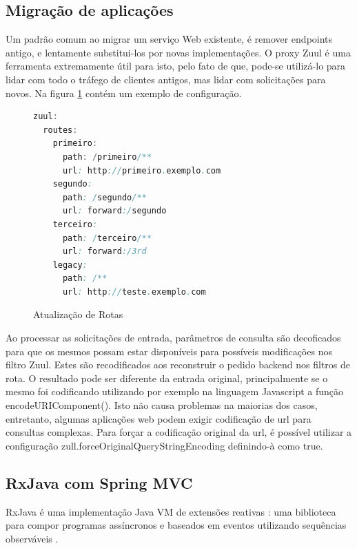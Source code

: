 \documentclass[journal]{IEEEtran}
\begin{document}
\subsection{Migração de aplicações}

Um padrão comum ao migrar um serviço Web existente, é remover endpoints antigo, e lentamente substitui-los por novas implementações. O proxy Zuul é uma ferramenta extremamente útil para isto, pelo fato de que, pode-se utilizá-lo para lidar com todo o tráfego de clientes antigos, mas lidar com solicitações para novos. Na figura \ref{alg:vinteum} contém um exemplo de configuração.

\begin{figure}[h]
\centering

\begin{lstlisting}[language=Java]
 zuul:
  routes:
    primeiro:
      path: /primeiro/**
      url: http://primeiro.exemplo.com
    segundo:
      path: /segundo/**
      url: forward:/segundo
    terceiro:
      path: /terceiro/**
      url: forward:/3rd
    legacy:
      path: /**
      url: http://teste.exemplo.com
\end{lstlisting}

\caption{Atualização de Rotas}
\label{alg:vinteum}
\end{figure}

Ao processar as solicitações de entrada, parâmetros de consulta são  decoficados para que os mesmos possam estar disponíveis para possíveis modificações nos filtro Zuul. Estes são recodificados aos reconstruir o pedido backend nos filtros de rota. O resultado pode ser diferente da entrada original, principalmente se o mesmo foi codificando utilizando por exemplo na linguagem Javascript a função encodeURIComponent(). Isto não causa problemas na maiorias dos casos, entretanto, algumas aplicações web podem exigir codificação de url para consultas complexas. Para forçar a codificação original da url, é possível utilizar a configuração zull.forceOriginalQueryStringEncoding definindo-à como true.


\subsection{RxJava com Spring MVC}

RxJava é uma implementação Java VM de extensões reativas : uma biblioteca para compor programas assíncronos e baseados em eventos utilizando sequências observáveis \cite{reactivex2017}.
\end{document}
